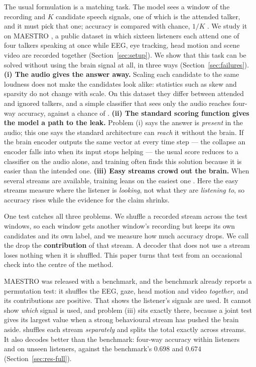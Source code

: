 The usual formulation is a matching task. The model sees a window of the
recording and $K$ candidate speech signals, one of which is the attended talker,
and it must pick that one; accuracy is compared with chance, $1/K$
\citep{accou2021,monesi2020,puffay2023}. We study it on MAESTRO
\citep{maestro2026}, a public dataset in which sixteen listeners each attend one
of four talkers speaking at once while EEG, eye tracking, head motion and scene
video are recorded together (Section~\ref{sec:setup}). We show that this task
can be solved without using the brain signal at all, in three ways
(Section~\ref{sec:failures}).
\textbf{(i) The audio gives the answer away.} Scaling each candidate to the same
loudness does not make the candidates look alike: statistics such as skew and
sparsity do not change with scale. On this dataset they differ between attended
and ignored talkers, and a simple classifier that sees only the audio reaches
 four-way accuracy, against a chance of .
\textbf{(ii) The standard scoring function gives the model a path to the leak.}
Problem (i) says the answer is \emph{present} in the audio; this one says the
standard architecture can \emph{reach} it without the brain. If the brain
encoder outputs the same vector at every time step --- the collapse an encoder
falls into when its input stops helping --- the usual score reduces to a
classifier on the audio alone, and training often finds this solution because it
is easier than the intended one.
\textbf{(iii) Easy streams crowd out the brain.} When several streams are
available, training leans on the easiest one
\citep{wang2020gradblend,huang2022competition,wu2022greedy,peng2022ogm}. Here
the easy streams measure where the listener is \emph{looking}, not what they are
\emph{listening to}, so accuracy rises while the evidence for the claim shrinks.

One test catches all three problems. We shuffle a recorded stream across the
test windows, so each window gets another window's recording but keeps its own
candidates and its own label, and we measure how much accuracy drops. We call the
drop the \textbf{contribution} of that stream. A decoder that does not use a
stream loses nothing when it is shuffled. This paper turns that test from an
occasional check into the centre of the method.

MAESTRO was released with a benchmark, and the benchmark already reports a
permutation test: it shuffles the EEG, gaze, head motion and video
\emph{together}, and its contributions are positive. That shows the listener's signals are used. It cannot show \emph{which}
signal is used, and problem (iii) sits exactly there, because a joint test gives
its largest value when a strong behavioural stream has pushed the brain aside.
\merit{} shuffles each stream \emph{separately} and splits the total exactly
across streams. It also decodes better than the benchmark:
 four-way accuracy within listeners and
 on unseen listeners, against the
benchmark's $0.698$ and $0.674$ (Section~\ref{sec:res-full}).

